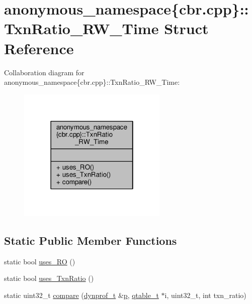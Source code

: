 \hypertarget{structanonymous__namespace_02cbr_8cpp_03_1_1TxnRatio__RW__Time}{\section{anonymous\-\_\-namespace\{cbr.\-cpp\}\-:\-:Txn\-Ratio\-\_\-\-R\-W\-\_\-\-Time Struct Reference}
\label{structanonymous__namespace_02cbr_8cpp_03_1_1TxnRatio__RW__Time}
}


Collaboration diagram for anonymous\-\_\-namespace\{cbr.\-cpp\}\-:\-:Txn\-Ratio\-\_\-\-R\-W\-\_\-\-Time\-:
\nopagebreak
\begin{figure}[H]
\begin{center}
\leavevmode
\includegraphics[width=202pt]{structanonymous__namespace_02cbr_8cpp_03_1_1TxnRatio__RW__Time__coll__graph}
\end{center}
\end{figure}
\subsection*{Static Public Member Functions}
\begin{DoxyCompactItemize}
\item 
static bool \hyperlink{structanonymous__namespace_02cbr_8cpp_03_1_1TxnRatio__RW__Time_a7c5bdf4d3b8d57d95f764cd4008eac8c}{uses\-\_\-\-R\-O} ()
\item 
static bool \hyperlink{structanonymous__namespace_02cbr_8cpp_03_1_1TxnRatio__RW__Time_a5e18d4327d0d6d94aa109c9644c99eaf}{uses\-\_\-\-Txn\-Ratio} ()
\item 
static uint32\-\_\-t \hyperlink{structanonymous__namespace_02cbr_8cpp_03_1_1TxnRatio__RW__Time_a5b17b12fa2109012d0c8b38b17a3d7c2}{compare} (\hyperlink{structstm_1_1dynprof__t}{dynprof\-\_\-t} \&\hyperlink{counted__ptr_8hpp_a5c9f59d7c24e3fd6ceae319a968fc3e0}{p}, \hyperlink{structstm_1_1qtable__t}{qtable\-\_\-t} $\ast$i, uint32\-\_\-t, int txn\-\_\-ratio)
\end{DoxyCompactItemize}


